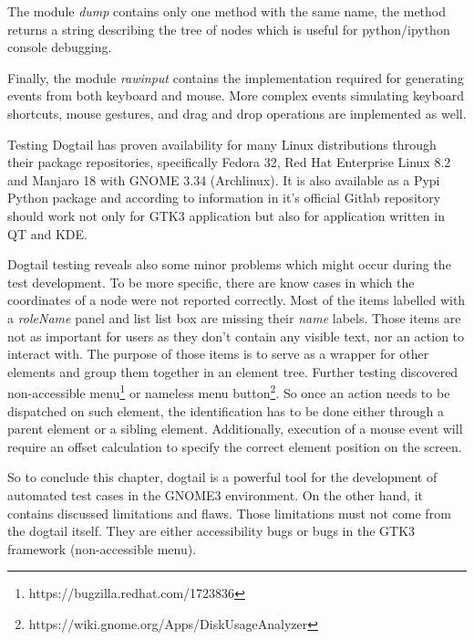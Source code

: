 The module \textit{dump} contains only one method with the same name, the method returns a string describing the tree of nodes which is useful for python/ipython console debugging.

Finally, the module \textit{rawinput} contains the implementation required for generating events from both keyboard and mouse. More complex events simulating keyboard shortcuts, mouse gestures, and drag and drop operations are implemented as well.  


 Testing Dogtail has proven availability for many Linux distributions through their package repositories, specifically Fedora 32, Red Hat Enterprise Linux 8.2 and Manjaro 18 with GNOME 3.34 (Archlinux). It is also available as a Pypi Python package and according to information in it's official Gitlab repository should work not only for GTK3 application but also for application written in QT and KDE. 
 
 Dogtail testing reveals also some minor problems which might occur during the test development. To be more specific, there are know cases in which the coordinates of a node were not reported correctly. Most of the items labelled with a \textit{roleName} panel and list list box are missing their \textit{name} labels. Those items are not as important for users as they don't contain any visible text, nor an action to interact with. The purpose of those items is to serve as a wrapper for other elements and group them together in an element tree. Further testing discovered non-accessible menu\footnote{https://bugzilla.redhat.com/1723836} or nameless menu button\footnote{https://wiki.gnome.org/Apps/DiskUsageAnalyzer}. So once an action needs to be dispatched on such element, the identification has to be done either through a parent element or a sibling element. Additionally, execution of a mouse event will require an offset calculation to specify the correct element position on the screen.
 
 So to conclude this chapter, dogtail is a powerful tool for the development of automated test cases in the GNOME3 environment. On the other hand, it contains discussed limitations and flaws. Those limitations must not come from the dogtail itself. They are either accessibility bugs or bugs in the GTK3 framework (non-accessible menu).  

